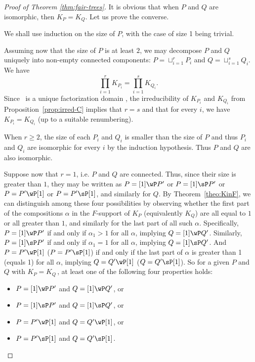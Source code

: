\begin{proof}[Proof of Theorem \ref{thm:fair-trees}]
It is obvious that when $P$ and $Q$ are isomorphic, then $K_P=K_Q$.
Let us prove the converse.

We shall use induction on the size of $P$, with the case of size 1 being trivial.

Assuming now that the size of $P$ is at least $2$, 
we may decompose $P$ and $Q$ uniquely into non-empty
connected components:
$P=\sqcup_{i=1}^r P_i$
and
$Q=\sqcup_{i=1}^s Q_i$.
We have
\[
\prod_{i=1}^r K_{P_i}
=
\prod_{i=1}^s K_{Q_i}.
\]
Since \qsym\  is a unique factorization domain \cite{Haz01,LaPy08,MaRe95}, 
the irreducibility of $K_{P_i}$ and $K_{Q_i}$ from Proposition~\ref{prop:irred-C} 
implies that $r=s$ and that for every $i$, we have $K_{P_i} = K_{Q_i}$ (up to a suitable renumbering).

When $r \ge 2$, the size of each $P_i$ and $Q_i$ is smaller than the size of $P$
and thus $P_i$ and $Q_i$ are isomorphic for every $i$ by the induction hypothesis. 
Thus $P$ and $Q$ are also isomorphic. 

Suppose now that $r = 1$, i.e. $P$ and $Q$ are connected. Thus, 
since their size is greater than $1$, they may be written as
$P=[1]\wP P'$ or $P=[1]\sP P'$
or
$P=P'\wP [1]$ or $P=P' \sP [1]$,
and similarly for $Q$.
By Theorem~\ref{theo:KinF}, we can distinguish among these four possibilities by observing whether the first part of the compositions $\alpha$ in the $F$-support of $K_P$ (equivalently $K_Q$) are all equal to $1$ or all greater than $1$, and similarly for the last part of all such $\alpha$. Specifically, $P=[1]\wP P'$ if and only if $\alpha_1 > 1$ for all $\alpha$, implying $Q=[1]\wP Q'$.  Similarly, $P=[1]\sP P'$ if and only if $\alpha_1=1$ for all $\alpha$, implying $Q=[1]\sP Q'$.  And $P=P'\wP [1]$ (\resp $P=P' \sP [1]$) if and only if the last part of $\alpha$ is greater than 1 (\resp equals 1) for all $\alpha$, implying $Q=Q'\wP [1]$ (\resp $Q=Q' \sP [1]$).  
So for a given $P$ and $Q$ with $K_P = K_Q$\,, at least one of the following four properties holds:
\begin{itemize}
\item $P=[1]\wP P'$ and $Q=[1]\wP Q'$, or 
\item $P=[1]\sP P'$ and $Q=[1]\sP Q'$, or
\item $P=P'\wP [1]$ and $Q=Q'\wP [1]$, or 
\item $P=P'\sP [1]$ and $Q=Q'\sP [1]$.
\end{itemize}


\end{proof}
